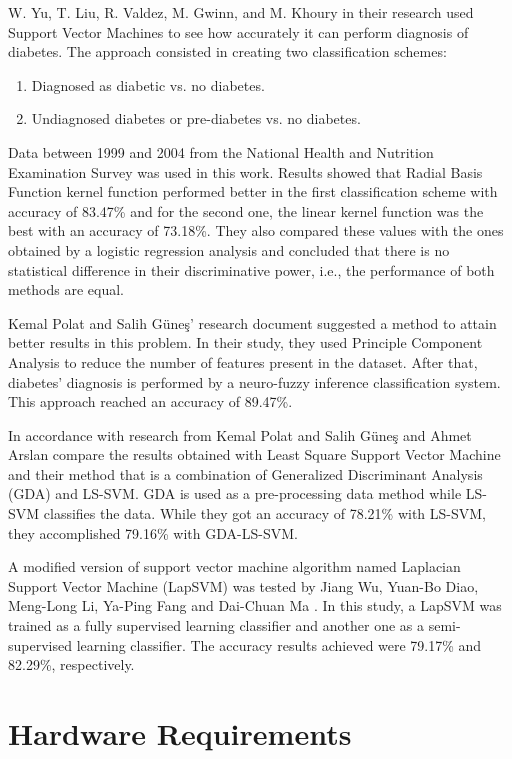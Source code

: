 \documentclass[12pt]{article}
\begin{document}
W. Yu, T. Liu, R. Valdez, M. Gwinn, and M. Khoury \cite{biomedcentral} in their research used Support Vector Machines to see how accurately it can perform diagnosis of diabetes. The approach consisted in creating two classification schemes: 
\begin{enumerate}
\item Diagnosed as diabetic vs. no diabetes.
\item Undiagnosed diabetes or pre-diabetes vs. no diabetes.
\end{enumerate}
Data between 1999 and 2004 from the National Health and Nutrition Examination Survey was used in this work. Results showed that
Radial Basis Function kernel function performed better in the first classification scheme with accuracy of 83.47\% and for the second one, the linear kernel function was the best with an accuracy of 73.18\%. They also compared these values with the
ones obtained by a logistic regression analysis and concluded that there is no statistical difference in their discriminative power, i.e., the performance of both methods are equal.

Kemal Polat and Salih Güneş' research document\cite{POLAT2007702} suggested a method to attain better results in this problem. In their study, they used Principle Component Analysis to reduce the number of features present in the dataset. After that, diabetes’ diagnosis is performed by a neuro-fuzzy inference classification system. This approach reached an accuracy of 89.47\%.

In accordance with research from Kemal Polat and Salih Güneş and Ahmet Arslan\cite{POLAT2008482} compare the results obtained with Least Square Support Vector Machine and their method that is a combination of Generalized Discriminant Analysis (GDA) and LS-SVM. GDA is used as a pre-processing data method while LS-SVM classifies the data. While they got an accuracy of 78.21\% with LS-SVM, they accomplished 79.16\% with GDA-LS-SVM.

A modified version of support vector machine algorithm named Laplacian Support Vector Machine (LapSVM) was tested by Jiang Wu, Yuan-Bo Diao, Meng-Long Li, Ya-Ping Fang and Dai-Chuan Ma \cite{semisupervised}. In this study, a LapSVM was trained as a fully supervised learning classifier and another one as a semi-supervised learning classifier. The accuracy results achieved were 79.17\% and 82.29\%, respectively.

\clearpage
\newpage
\section{Hardware Requirements}
\end{document}
